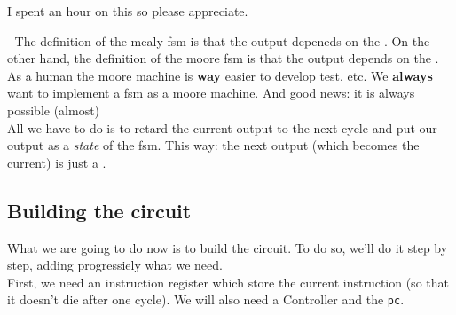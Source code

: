 I spent an hour on this so please appreciate.\\
\begin{parag}{$\;$}
    The definition of the mealy fsm is that the output depeneds on the . On the other hand, the definition of the moore fsm is that the output depends on the . \\
	As a human the moore machine is \textbf{way} easier to develop test, etc. We \textbf{always} want to implement a fsm as a moore machine. And good news: it is always possible (almost)\\
	All we have to do is to retard the current output to the next cycle and put our output as a \textit{state} of the fsm. This way: the next output (which becomes the current) is just a .

\end{parag}
\subsection{Building the circuit}

    What we are going to do now is to build the circuit. To do so, we'll do it step by step, adding progressiely what we need.\\
	First, we need an instruction register which store the current instruction (so that it doesn't die after one cycle). We will also need a Controller and the \texttt{pc}.\\

